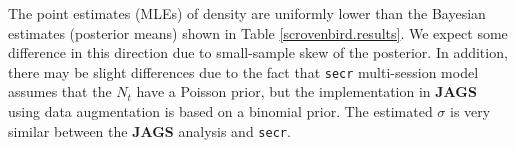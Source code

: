 The point estimates (MLEs) of density are uniformly lower than the Bayesian estimates
(posterior means)
shown in Table \ref{scrovenbird.results}.
We expect some difference in this direction due to
small-sample skew of the posterior.
In addition, there may be slight differences due to the fact that 
 \mbox{\tt secr}
multi-session 
model assumes that the $N_{t}$ have a Poisson prior, but the
implementation in {\bf JAGS} using data augmentation is based on a
binomial prior.
The estimated $\sigma$ is very similar between the {\bf JAGS}
analysis and \mbox{\tt secr}.

